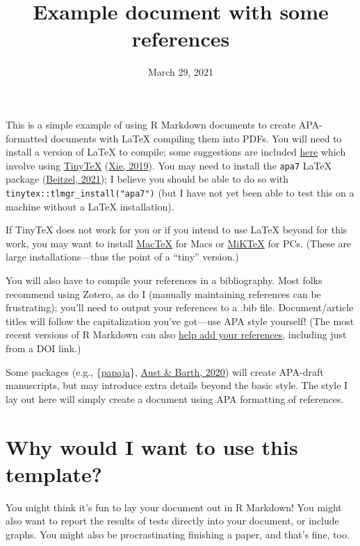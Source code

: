 \documentclass[jou]{apa7}
\title{Example document with some references}
\date{March 29, 2021}
\begin{document}
\maketitle

This is a simple example of using R Markdown documents to create
APA-formatted documents with LaTeX compiling them into PDFs. You will
need to install a version of LaTeX to compile; some suggestions are
included
\href{https://bookdown.org/yihui/rmarkdown-cookbook/install-latex.html}{here}
which involve using \href{https://yihui.org/tinytex/}{TinyTeX}
(\protect\hyperlink{ref-xie2019}{Xie, 2019}). You may need to install
the \texttt{apa7} LaTeX package
(\protect\hyperlink{ref-weiss2021}{Beitzel, 2021}); I believe you should
be able to do so with \texttt{tinytex::tlmgr\_install("apa7")} (but I
have not yet been able to test this on a machine without a LaTeX
installation).

If TinyTeX does not work for you or if you intend to use LaTeX beyond
for this work, you may want to install
\href{http://tug.org/mactex/}{MacTeX} for Macs or
\href{https://miktex.org/}{MiKTeX} for PCs. (These are large
installations---thus the point of a ``tiny'' version.)

You will also have to compile your references in a bibliography. Most
folks recommend using Zotero, as do I (manually maintaining references
can be frustrating); you'll need to output your references to a .bib
file. Document/article titles will follow the capitalization you've
got---use APA style yourself! (The most recent versions of R Markdown
can also
\href{https://rmarkdown.rstudio.com/authoring_bibliographies_and_citations.html}{help
add your references}, including just from a DOI link.)

Some packages (e.g., \{\href{https://github.com/crsh/papaja}{papaja}\},
\protect\hyperlink{ref-austbarth2020}{Aust \& Barth, 2020}) will create
APA-draft manuscripts, but may introduce extra details beyond the basic
style. The style I lay out here will simply create a document using APA
formatting of references.

\hypertarget{why-would-i-want-to-use-this-template}{%
\section{Why would I want to use this
template?}\label{why-would-i-want-to-use-this-template}}

You might think it's fun to lay your document out in R Markdown! You
might also want to report the results of tests directly into your
document, or include graphs. You might also be procrastinating finishing
a paper, and that's fine, too.
\end{document}
